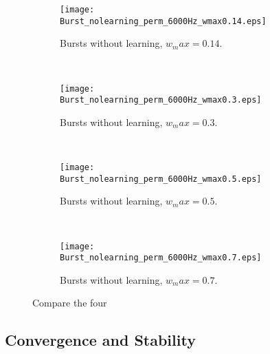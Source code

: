 \begin{itemize}
\begin{figure}[H]
\centering
\begin{subfigure}[b]{0.49\textwidth}
\texttt{[image: Burst\_nolearning\_perm\_6000Hz\_wmax0.14.eps]}
\label{Burst_no_learning: 0.14}
\caption{Bursts without learning, \(w_max = 0.14\).}
\end{subfigure}
\,
\begin{subfigure}[b]{0.49\textwidth}
\texttt{[image: Burst\_nolearning\_perm\_6000Hz\_wmax0.3.eps]}
\label{Burst_no_learning: 0.3}
\caption{Bursts without learning, \(w_max = 0.3\).}
\end{subfigure}
\\
\begin{subfigure}[b]{0.49\textwidth}
\texttt{[image: Burst\_nolearning\_perm\_6000Hz\_wmax0.5.eps]}
\label{Burst_no_learning: 0.5}
\caption{Bursts without learning, \(w_max = 0.5\).}
\end{subfigure}
\,
\begin{subfigure}[b]{0.49\textwidth}
\texttt{[image: Burst\_nolearning\_perm\_6000Hz\_wmax0.7.eps]}
\label{Burst_no_learning: 0.7}
\caption{Bursts without learning, \(w_max = 0.7\).}
\end{subfigure}
\label{Burst_no_learning}
\caption{Compare the four}
\end{figure}
\end{itemize}

\subsection{Convergence and Stability}

